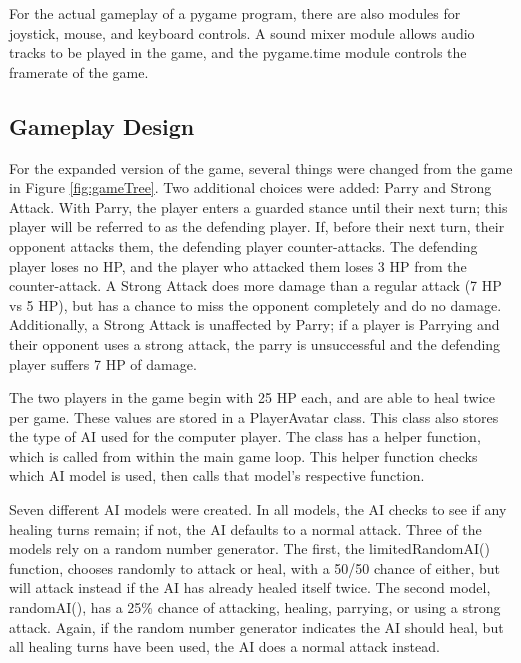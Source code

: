 For the actual gameplay of a pygame program, there are also modules for joystick, mouse, and keyboard controls. A sound mixer module allows audio tracks to be played in the game, and the pygame.time module controls the framerate of the game.

\subsection{Gameplay Design}
For the expanded version of the game, several things were changed from the game in Figure \ref{fig:gameTree}. Two additional choices were added: Parry and Strong Attack. With Parry, the player enters a guarded stance until their next turn; this player will be referred to as the defending player. If, before their next turn, their opponent attacks them, the defending player counter-attacks. The defending player loses no HP, and the player who attacked them loses 3 HP from the counter-attack. A Strong Attack does more damage than a regular attack (7 HP vs 5 HP), but has a chance to miss the opponent completely and do no damage. Additionally, a Strong Attack is unaffected by Parry; if a player is Parrying and their opponent uses a strong attack, the parry is unsuccessful and the defending player suffers 7 HP of damage.

The two players in the game begin with 25 HP each, and are able to heal twice per game. These values are stored in a PlayerAvatar class. This class also stores the type of AI used for the computer player. The class has a helper function, which is called from within the main game loop. This helper function checks which AI model is used, then calls that model's respective function.

Seven different AI models were created. In all models, the AI checks to see if any healing turns remain; if not, the AI defaults to a normal attack. Three of the models rely on a random number generator. The first, the limitedRandomAI() function, chooses randomly to attack or heal, with a 50/50 chance of either, but will attack instead if the AI has already healed itself twice. The second model, randomAI(), has a 25\% chance of attacking, healing, parrying, or using a strong attack. Again, if the random number generator indicates the AI should heal, but all healing turns have been used, the AI does a normal attack instead.